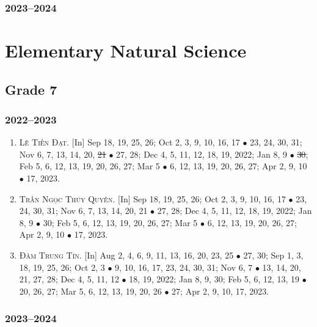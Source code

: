 \documentclass{article}
\begin{document}
\subsubsection{2023--2024}


\section{Elementary Natural Science}

\subsection{Grade 7}

\subsubsection{2022--2023}

\begin{enumerate}
	\item \textsc{Lê Tiến Đạt.} \textsf{[In]} Sep 18, 19, 25, 26; Oct 2, 3, 9, 10, 16, 17 $\bullet$ 23, 24, 30, 31; Nov 6, 7, 13, 14, 20, \st{21} $\bullet$ 27, 28; Dec 4, 5, 11, 12, 18, 19, 2022; Jan 8, 9 $\bullet$ \st{30}; Feb 5, 6, 12, 13, 19, 20, 26, 27; Mar 5 $\bullet$ 6, 12, 13, 19, 20, 26, 27; Apr 2, 9, 10 $\bullet$ 17, 2023.
	\item \textsc{Trần Ngọc Thúy Quyên.} \textsf{[In]} Sep 18, 19, 25, 26; Oct 2, 3, 9, 10, 16, 17 $\bullet$ 23, 24, 30, 31; Nov 6, 7, 13, 14, 20, 21 $\bullet$ 27, 28; Dec 4, 5, 11, 12, 18, 19, 2022; Jan 8, 9 $\bullet$ 30; Feb 5, 6, 12, 13, 19, 20, 26, 27; Mar 5 $\bullet$ 6, 12, 13, 19, 20, 26, 27; Apr 2, 9, 10 $\bullet$ 17, 2023.
	\item \textsc{Đàm Trung Tín.} \textsf{[In]} Aug 2, 4, 6, 9, 11, 13, 16, 20, 23, 25 $\bullet$ 27, 30; Sep 1, 3, 18, 19, 25, 26; Oct 2, 3 $\bullet$ 9, 10, 16, 17, 23, 24, 30, 31; Nov 6, 7 $\bullet$ 13, 14, 20, 21, 27, 28; Dec 4, 5, 11, 12 $\bullet$ 18, 19, 2022; Jan 8, 9, 30; Feb 5, 6, 12, 13, 19 $\bullet$ 20, 26, 27; Mar 5, 6, 12, 13, 19, 20, 26 $\bullet$ 27; Apr 2, 9, 10, 17, 2023.
\end{enumerate}

\subsubsection{2023--2024}

\end{document}
